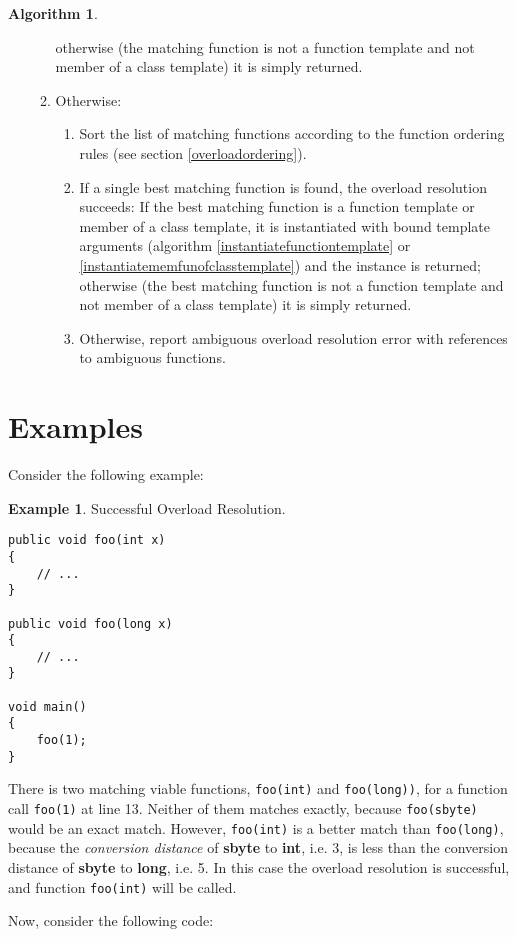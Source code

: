 \documentclass[a4paper,oneside,11pt]{book}
\theoremstyle{definition}
\newtheorem{exmp}{Example}[section]
\newtheorem{algo}{Algorithm}[section]
\begin{document}
\begin{algo}
\begin{enumerate}
\begin{enumerate}
otherwise (the matching function is not a function template and not member of a class template) it is simply returned.
\item
Otherwise:
\begin{enumerate}
\item
Sort the list of matching functions according to the function ordering rules (see section \ref{overloadordering}).
\item
If a single best matching function is found, the overload resolution succeeds:
If the best matching function is a function template or member of a class template, it is instantiated with bound template arguments
(algorithm \ref{instantiatefunctiontemplate} or \ref{instantiatememfunofclasstemplate})
and the instance is returned; otherwise (the best matching function is not a function template and not member of a class template) it is simply returned.
\item
Otherwise, report ambiguous overload resolution error with references to ambiguous functions.
\end{enumerate}
\end{enumerate}
\end{enumerate}
\end{algo}

\section{Examples}

Consider the following example:

\begin{exmp} Successful Overload Resolution.
\lstset{language=Cmajor}
\begin{lstlisting}[frame=trBL]
public void foo(int x)
{
    // ...
}

public void foo(long x)
{
    // ...
}

void main()
{
    foo(1);
}
\end{lstlisting}

There is two matching viable functions, \verb|foo(int)| and \verb|foo(long))|, for a function call \verb|foo(1)| at line 13.
Neither of them matches exactly, because \verb|foo(sbyte)| would be an exact match.
However, \verb|foo(int)| is a better match than \verb|foo(long)|, because the \emph{conversion distance} of \textbf{sbyte} to \textbf{int}, i.e. 3, is less than
the conversion distance of \textbf{sbyte} to \textbf{long}, i.e. 5.
In this case the overload resolution is successful, and function \verb|foo(int)| will be called.
\end{exmp}
\clearpage
Now, consider the following code:
\end{document}
